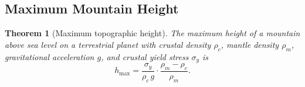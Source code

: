 \documentclass[10pt,twocolumn]{article}
\newtheorem{theorem}{Theorem}[section]
\theoremstyle{definition}
\theoremstyle{remark}
\begin{document}
\subsection{Maximum Mountain Height}\label{sec:mountains}

\begin{theorem}[Maximum topographic height]
\label{thm:mountain}
The maximum height of a mountain above sea level on a
terrestrial planet with crustal density $\rho_c$, mantle
density $\rho_m$, gravitational acceleration $g$, and crustal
yield stress $\sigma_y$ is
\begin{equation}\label{eq:hmax}
  h_{\max} = \frac{\sigma_y}{\rho_c\, g}
  \cdot\frac{\rho_m - \rho_c}{\rho_m}.
\end{equation}
\end{theorem}
\end{document}
